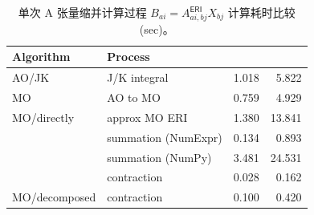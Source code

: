 \begin{table}[h]
  \centering
  \caption{单次 A 张量缩并计算过程 $B_{ai} = A_{ai, bj}^\textsf{ERI} X_{bj}$ 计算耗时比较 (sec)。}
  \label{tab.3.A-tensor-contraction-MO}
  \begin{tabular}{ll:d{2.4}d{2.4}}
  \hline
  Algorithm     & Process  &  &  \\ \hline
  AO/JK         & J/K integral        & 1.018 & 5.822  \\
  MO            & AO to MO            & 0.759 & 4.929  \\
  MO/directly   & approx MO ERI       & 1.380 & 13.841 \\
                & summation (NumExpr) & 0.134 & 0.893  \\
                & summation (NumPy)   & 3.481 & 24.531 \\
                & contraction         & 0.028 & 0.162  \\
  MO/decomposed & contraction         & 0.100 & 0.420  \\ \hline
  \end{tabular}


\end{table}
